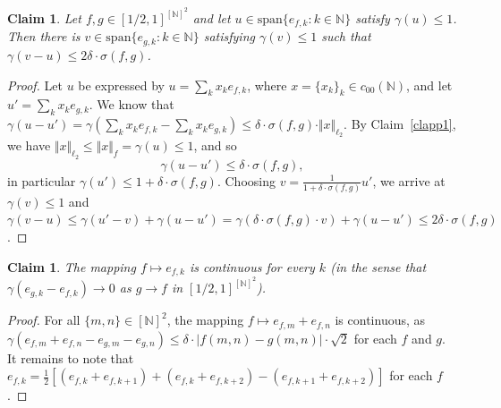 \documentclass[a4paper]{amsart}
\theoremstyle{plain}
\newtheorem{claim}[theorem]{Claim}
\theoremstyle{remark}
\begin{document}
\begin{claim} \label{clapp3}
Let $ f, g \in [1/2, 1]^{[\mathbb{N}]^{2}} $ and let $ u \in \mathrm{span} \{ e_{f, k} : k \in \mathbb{N} \} $ satisfy $ \gamma(u) \leq 1 $. Then there is $ v \in \mathrm{span} \{ e_{g, k} : k \in \mathbb{N} \} $ satisfying $ \gamma(v) \leq 1 $ such that $ \gamma(v - u) \leq 2 \delta \cdot \sigma(f, g) $.
\end{claim}

\begin{proof}
Let $ u $ be expressed by $ u = \sum_{k} x_{k} e_{f, k} $, where $ x = \{ x_{k} \}_{k} \in c_{00}(\mathbb{N}) $, and let $ u' = \sum_{k} x_{k} e_{g, k} $. We know that $ \gamma(u - u') = \gamma(\sum_{k} x_{k} e_{f, k} - \sum_{k} x_{k} e_{g, k}) \leq \delta \cdot \sigma(f, g) \cdot \Vert x \Vert_{\ell_{2}} $. By Claim~\ref{clapp1}, we have $ \Vert x \Vert_{\ell_{2}} \leq \Vert x \Vert_{f} = \gamma(u) \leq 1 $, and so
$$ \gamma(u - u') \leq \delta \cdot \sigma(f, g), $$
in particular $ \gamma(u') \leq 1 + \delta \cdot \sigma(f, g) $. Choosing $ v = \frac{1}{1 + \delta \cdot \sigma(f, g)} u' $, we arrive at $ \gamma(v) \leq 1 $ and $ \gamma(v - u) \leq \gamma(u' - v) + \gamma(u - u') = \gamma(\delta \cdot \sigma(f, g) \cdot v) + \gamma(u - u') \leq 2 \delta \cdot \sigma(f, g) $.
\end{proof}


\begin{claim} \label{clapp4}
The mapping $ f \mapsto e_{f, k} $ is continuous for every $ k $ (in the sense that $ \gamma(e_{g, k} - e_{f, k}) \to 0 $ as $ g \to f $ in $ [1/2, 1]^{[\mathbb{N}]^{2}} $).
\end{claim}

\begin{proof}
For all $ \{ m, n \} \in [\mathbb{N}]^{2} $, the mapping $ f \mapsto e_{f, m} + e_{f, n} $ is continuous, as $ \gamma(e_{f, m} + e_{f, n} - e_{g, m} - e_{g, n}) \leq \delta \cdot |f(m, n) - g(m, n)| \cdot \sqrt{2} $ for each $ f $ and $ g $. It remains to note that $ e_{f, k} = \frac{1}{2} [(e_{f, k} + e_{f, k+1}) + (e_{f, k} + e_{f, k+2}) - (e_{f, k+1} + e_{f, k+2})] $ for each $ f $.
\end{proof}
\end{document}
